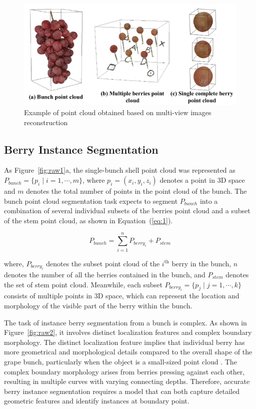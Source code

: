\documentclass[12pt]{article}
\begin{document}
\begin{figure}[hbt!]
    \centering
    \includegraphics[width=1\textwidth]{figures/Figure4.pdf}
    \caption{Example of point cloud obtained based on multi-view images reconstruction}
    \label{fig:raw10}
\end{figure}

\subsection{Berry Instance Segmentation}
\label{sec:22}

As Figure~\ref{fig:raw1}a, the single-bunch shell point cloud was represented as $P_{bunch}=\{p_i \mid i=1, \cdots, m\}$, where $p_i=(x_i,y_i,z_i)$ denotes a point in 3D space and $m$ denotes the total number of points in the point cloud of the bunch. The bunch point cloud segmentation task expects to segment $P_{bunch}$ into a combination of several individual subsets of the berries point cloud and a subset of the stem point cloud, as shown in Equation~(\ref{eq:1}).

\begin{equation}
P_{bunch} = \sum_{i=1}^{n} P_{berry_{i}} + P_{stem}
\label{eq:1}
\end{equation}

{\raggedright where, $P_{berry_{i}}$ denotes the subset point cloud of the $i^{\text{th}}$ berry in the bunch, $n$ denotes the number of all the berries contained in the bunch, and $P_{stem}$ denotes the set of stem point cloud. 
Meanwhile, each subset $P_{berry_{i}}=\{p_j \mid j=1, \cdots, k\}$ consists of multiple points in 3D space, which can represent the location and morphology of the visible part of the berry within the bunch.}

The task of instance berry segmentation from a bunch is complex. 
As shown in Figure~\ref{fig:raw2}, it involves distinct localization features and complex boundary morphology. 
The distinct localization feature implies that individual berry has more geometrical and morphological details compared to the overall shape of the grape bunch, particularly when the object is a small-sized point cloud \citep{luo_infield_2022}. 
The complex boundary morphology arises from berries pressing against each other, resulting in multiple curves with varying connecting depths. 
Therefore, accurate berry instance segmentation requires a model that can both capture detailed geometric features and identify instances at boundary point. 
\end{document}
